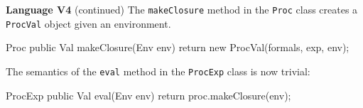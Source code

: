 \begin{minipage}[t]{\sw}
\slidenumber
\LARGE
{\bf Language V4} (continued)\exx
\Large
\emm{}\exx
\LARGE
The \verb'makeClosure' method in the \verb'Proc' class
creates a \verb'ProcVal' object given an environment.
\Large
\begin{qv}
Proc
    public Val makeClosure(Env env) {
        return new ProcVal(formals, exp, env);
    }
\end{qv}
\LARGE
The semantics of the \verb'eval' method
in the \verb'ProcExp' class is now trivial:
\Large
\begin{qv}
ProcExp
    public Val eval(Env env) {
        return proc.makeClosure(env);
    }
\end{qv}
\end{minipage}


